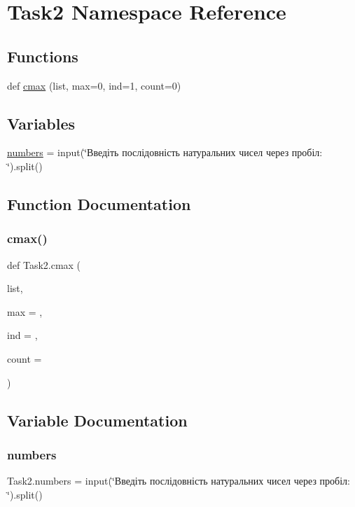 \hypertarget{namespace_task2}{}\section{Task2 Namespace Reference}
\label{namespace_task2}
\subsection*{Functions}
\begin{DoxyCompactItemize}
\item 
def \hyperlink{namespace_task2_ad858fbd5fc00bbf25f80be3c0ab28e49}{cmax} (list, max=0, ind=1, count=0)
\end{DoxyCompactItemize}
\subsection*{Variables}
\begin{DoxyCompactItemize}
\item 
\hyperlink{namespace_task2_ae10806108edef00a9dbbd46e55d38545}{numbers} = input(\char`\"{}Введіть послідовність натуральних чисел через пробіл\+: \char`\"{}).split()
\end{DoxyCompactItemize}


\subsection{Function Documentation}
\mbox{\label{namespace_task2_ad858fbd5fc00bbf25f80be3c0ab28e49}} 
\subsubsection{\texorpdfstring{cmax()}{cmax()}}
{\footnotesize\ttfamily def Task2.\+cmax (\begin{DoxyParamCaption}\item[{}]{list,  }\item[{}]{max = {},  }\item[{}]{ind = {},  }\item[{}]{count = {} }\end{DoxyParamCaption})}



\subsection{Variable Documentation}
\mbox{\label{namespace_task2_ae10806108edef00a9dbbd46e55d38545}} 
\subsubsection{\texorpdfstring{numbers}{numbers}}
{\footnotesize\ttfamily Task2.\+numbers = input(\char`\"{}Введіть послідовність натуральних чисел через пробіл\+: \char`\"{}).split()}

